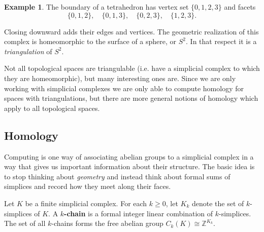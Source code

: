 \documentclass[11pt]{article}
\theoremstyle{plain}
\theoremstyle{definition}
\newtheorem{example}[theorem]{Example}
\theoremstyle{remark}
\begin{document}
\begin{example}\label{ex:tetrahedron-boundary}
    The boundary of a tetrahedron has vertex set $\{0,1,2,3\}$ and facets
    \[
        \{0,1,2\},\quad \{0,1,3\},\quad \{0,2,3\},\quad \{1,2,3\}.
    \]
    \begin{center}
    \end{center}
    Closing downward adds their edges and vertices. The geometric realization of this complex is homeomorphic to the surface of a sphere, or $S^2$. In that respect it is a \textit{triangulation} of $S^2$. 
\end{example}

Not all topological spaces are triangulable (i.e. have a simplicial complex to which they are homeomorphic), but many interesting ones are. Since we are only working with simplicial complexes we are only able to compute homology for spaces with triangulations, but there are more general notions of homology which apply to all topological spaces.  

\subsection{Homology}

Computing is one way of associating abelian groups to a simplicial complex in a way that gives us important information about their structure. The basic idea is to stop thinking about \textit{geometry} and instead think about formal sums of simplices and record how they meet along their faces. 

Let $K$ be a finite simplicial complex. For each $k\geq 0$, let $K_k$ denote the set of $k$-simplices of $K$. A \textbf{$k$-chain} is a formal integer linear combination of $k$-simplices. The set of all $k$-chains forms the free abelian group $C_k(K) \cong \mathbb Z^{K_k}$.
\end{document}
